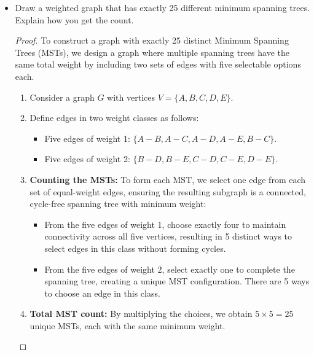 \documentclass[12pt]{article}
\theoremstyle{plain}
\begin{document}
\begin{itemize}
    \begin{center}
    \end{center}
    \newpage
    
    \item[(b)] Draw a weighted graph that has exactly 25 different minimum spanning trees. Explain how you get the count.
    \begin{proof}
        To construct a graph with exactly 25 distinct Minimum Spanning Trees (MSTs), we design a graph where multiple spanning trees have the same total weight by including two sets of edges with five selectable options each.
        
        \begin{enumerate}
            \item Consider a graph $G$ with vertices $V = \{A, B, C, D, E\}$.
            \item Define edges in two weight classes as follows:
                \begin{itemize}
                    \item Five edges of weight 1: $\{A - B, A - C, A - D, A - E, B - C\}$.
                    \item Five edges of weight 2: $\{B - D, B - E, C - D, C - E, D - E\}$.
                \end{itemize}
            \item \textbf{Counting the MSTs:} To form each MST, we select one edge from each set of equal-weight edges, ensuring the resulting subgraph is a connected, cycle-free spanning tree with minimum weight:
                \begin{itemize}
                    \item From the five edges of weight 1, choose exactly four to maintain connectivity across all five vertices, resulting in 5 distinct ways to select edges in this class without forming cycles.
                    \item From the five edges of weight 2, select exactly one to complete the spanning tree, creating a unique MST configuration. There are 5 ways to choose an edge in this class.
                \end{itemize}
            \item \textbf{Total MST count:} By multiplying the choices, we obtain $5 \times 5 = 25$ unique MSTs, each with the same minimum weight.
        \end{enumerate}
        

\end{proof}
\end{itemize}
\end{document}
